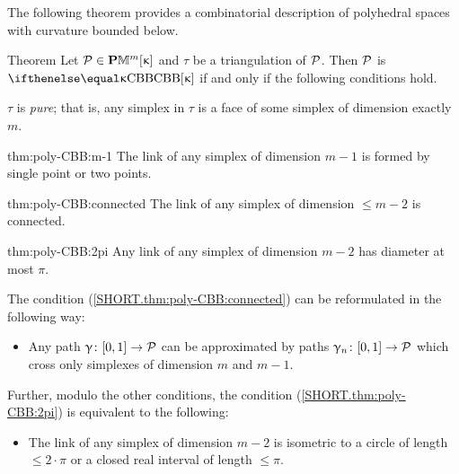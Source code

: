 
The following theorem provides a combinatorial description of polyhedral spaces with curvature bounded below.

\begin{thm}{Theorem}\label{thm:poly-CBB} Let $\spc{P}\in\PM{m}\kappa$ and $\tau$ be a triangulation of $\mathcal{P}$.
Then $\mathcal{P}$ is $\Alex\kappa$ if and only if the following conditions hold.

\begin{subthm}{} $\tau$ is \emph{pure}; 
that is, any simplex in $\tau$ is  a face of some simplex of dimension exactly $m$. 
\end{subthm}

\begin{subthm}{thm:poly-CBB:m-1}
The link of any simplex of dimension $m-1$ is formed by single point or two points.
\end{subthm}

\begin{subthm}{thm:poly-CBB:connected}
The link of any simplex of dimension $\le m-2$ is connected.
\end{subthm}

\begin{subthm}{thm:poly-CBB:2pi}
Any link of any simplex of dimension $m-2$
has diameter at most $\pi$.
\end{subthm}
\end{thm}

The condition (\ref{SHORT.thm:poly-CBB:connected})
can be reformulated in the following way:

\begin{itemize}
 \item[{\it \ref{SHORT.thm:poly-CBB:connected}$\,'\!$)}] 
Any path $\gamma\:[0,1]\to \spc{P}$ can be approximated by paths
$\gamma_n\:[0,1]\to \spc{P}$ 
which  cross only simplexes of dimension $m$ and $m-1$.
\end{itemize}

Further, modulo the other conditions,
the condition (\ref{SHORT.thm:poly-CBB:2pi})
is equivalent to the following:


\begin{itemize}
 \item[{\it \ref{SHORT.thm:poly-CBB:2pi}$\,'\!$)}] 
The link of any simplex of dimension $m-2$ is 
isometric to a circle of length $\le 2\cdot\pi$
or a closed real interval of length $\le \pi$.
\end{itemize}

